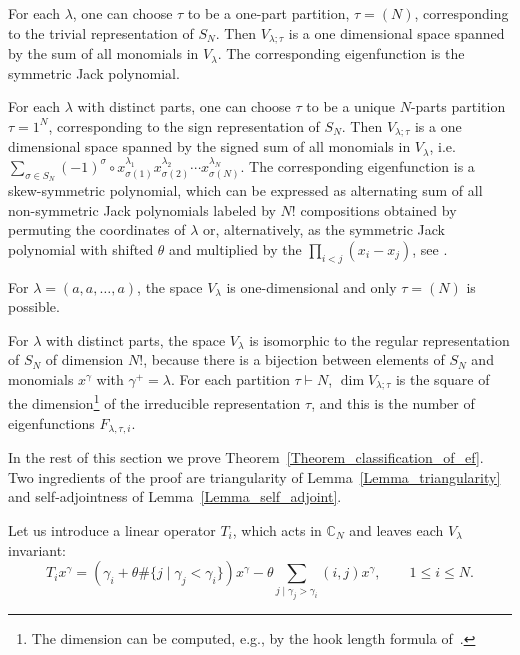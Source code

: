 \documentclass[11pt]{article}
\theoremstyle{definition}
\numberwithin{equation}{section}
\begin{document}
\begin{examples}
 For each $\lambda$, one can choose $\tau$ to be a one-part partition, $\tau=(N)$, corresponding to the trivial representation of $S_N$. Then $V_{\lambda;\tau}$ is a one dimensional space spanned by the sum of all monomials in $V_\lambda$. The corresponding eigenfunction is the symmetric Jack polynomial.

 For each $\lambda$ with distinct parts, one can choose $\tau$ to be a unique $N$-parts partition $\tau=1^{N}$, corresponding to the sign representation of $S_N$. Then $V_{\lambda;\tau}$ is a one dimensional space spanned by the signed sum of all monomials in $V_\lambda$, i.e.\ $\sum_{\sigma\in S_N} (-1)^{\sigma}  \circ x_{\sigma(1)}^{\lambda_1} x_{\sigma(2)}^{\lambda_2}\cdots x_{\sigma(N)}^{\lambda_N}$. The corresponding eigenfunction is a skew-symmetric polynomial, which can be expressed as alternating sum of all non-symmetric Jack polynomials labeled by $N!$ compositions obtained by permuting the coordinates of $\lambda$ or, alternatively, as the symmetric Jack polynomial with shifted $\theta$ and multiplied by the $\prod_{i<j}(x_i-x_j)$, see \cite[(2.40)]{baker1997calogero}.

 For $\lambda=(a,a,\dots,a)$, the space $V_\lambda$ is one-dimensional and only $\tau=(N)$ is possible.

 For $\lambda$ with distinct parts, the space $V_\lambda$ is isomorphic to the regular representation of $S_N$ of dimension $N!$, because there is a bijection between elements of $S_N$ and monomials $x^\gamma$ with $\gamma^+=\lambda$. For each partition $\tau\vdash N$, $\dim V_{\lambda;\tau}$ is the square of the dimension\footnote{The dimension can be computed, e.g., by the hook length formula of~\cite{frame1954hook}.} of the irreducible representation $\tau$, and this is the number of eigenfunctions $F_{\lambda,\tau,i}$.
\end{examples}

In the rest of this section we prove Theorem~\ref{Theorem_classification_of_ef}. Two ingredients of the proof are triangularity of Lemma~\ref{Lemma_triangularity} and self-adjointness of Lemma~\ref{Lemma_self_adjoint}.

Let us introduce a linear operator $T_i$, which acts in $\mathbb C_N$ and leaves each $V_\lambda$ invariant:
\begin{equation}
\label{eq_x4}
 T_i x^{\gamma}= \left(\gamma_i + \theta \#\{j\mid \gamma_j<\gamma_i\}\right)x^{\gamma}- \theta \sum_{j\mid \gamma_j>\gamma_i} (i,j) x^{\gamma}, \qquad 1\le i \le N.
\end{equation}
\end{document}

